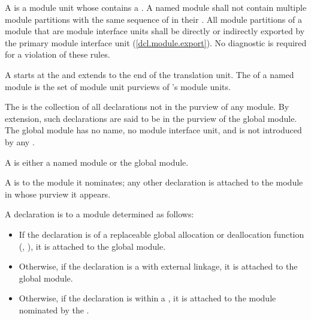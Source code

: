 \begin{std.txt}
\begin{after}\color{addclr}
\alinea
A  is
a module unit whose  contains
a .
A named module shall not contain multiple module partitions with
the same sequence of  in their
.
All module partitions of a module
that are module interface units
shall be directly or indirectly exported
by the primary module interface unit (\ref{dcl.module.export}).
No diagnostic is required for a violation of these rules.
\end{after}

\alinea
A  starts at the 
and extends to the end of the translation unit.
The  of a named module  is the set of module unit purviews
of 's module units. 

\alinea
The  is the collection of all declarations
not in the purview of any module.   By
extension, such declarations  are said to be in the purview of the
global module. 
\enternote
The global module has no name, no module interface unit, and is not
introduced by any .
\exitnote

\alinea
  A  is either a named module or the global module.
  \begin{before}\color{addclr}
  A  is
   to the module it nominates; any other declaration
  is attached to the module in whose purview it appears.
  \end{before}
  \begin{after}\color{addclr}
  A declaration is  to a module determined as follows:
  \begin{itemize}\color{addclr}
  \item If the declaration is of a replaceable global allocation or deallocation
  function (, ),
  it is attached to the global module.

  \item Otherwise, if the declaration is a
   with external linkage, it
  is attached to the global module.
  
  \item Otherwise, if the declaration is
  within a , it
  is attached to the module nominated by the
  .


\end{itemize}
\end{after}
\end{std.txt}
